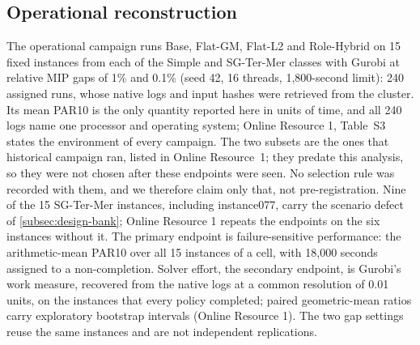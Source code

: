 \documentclass[smallextended,envcountsect,envcountsame]{svjour3}
\begin{document}
\subsection{Operational reconstruction}
\label{subsec:design-operational}
The operational campaign runs Base, Flat-GM, Flat-L2 and Role-Hybrid on 15 fixed instances from
each of the Simple and SG-Ter-Mer classes with Gurobi at relative MIP gaps of 1\% and 0.1\%
(seed 42, 16 threads, 1,800-second limit): 240 assigned runs, whose native logs and input
hashes were retrieved from the cluster. Its mean PAR10 is the only quantity reported here in
units of time, and all 240 logs name one processor and operating system; Online Resource 1,
Table~S3 states the environment of every campaign. The two subsets are the ones that historical campaign ran, listed in Online Resource~1;
they predate this analysis, so they were not chosen after these endpoints were seen. No
selection rule was recorded with them, and we therefore claim only that, not
pre-registration. Nine of the 15 SG-Ter-Mer instances, including instance077, carry the scenario defect of
\cref{subsec:design-bank}; Online Resource 1 repeats the endpoints on the six instances
without it.
The primary endpoint is failure-sensitive performance: the arithmetic-mean PAR10
over all 15 instances of a cell, with 18,000 seconds assigned to a non-completion. Solver effort,
the secondary endpoint, is Gurobi's work measure, recovered from the native logs at a common
resolution of 0.01 units, on the instances that every policy completed; paired geometric-mean
ratios carry exploratory bootstrap intervals (Online Resource 1). The two gap settings reuse the same instances and are not independent
replications.
\end{document}
